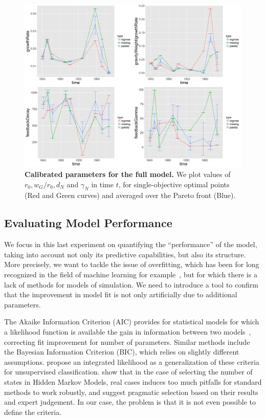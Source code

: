 \documentclass[Royal,sageh,times]{sagej}
\begin{document}
\begin{figure}
\centering
\includegraphics[width=\textwidth]{figures/Fig6}
\caption{\textbf{Calibrated parameters for the full model.} We plot values of $r_0, w_G/r_0, d_N$ and $\gamma_N$ in time $t$, for single-objective optimal points (Red and Green curves) and averaged over the Pareto front (Blue).}
\label{fig:feedback}
\end{figure}







\subsection*{Evaluating Model Performance}

We focus in this last experiment on quantifying the ``performance'' of the model, taking into account not only its predictive capabilities, but also its structure. More precisely, we want to tackle the issue of overfitting, which has been for long recognized in the field of machine learning for example~\citep{dietterich1995overfitting}, but for which there is a lack of methods for models of simulation. We need to introduce a tool to confirm that the improvement in model fit is not only artificially due to additional parameters.

The Akaike Information Criterion (AIC) provides for statistical models for which a likelihood function is available the gain in information between two models~\citep{akaike1998information}, correcting fit improvement for number of parameters. Similar methods include the Bayesian Information Criterion (BIC), which relies on slightly different assumptions. \cite{biernacki2000assessing} propose an integrated likelihood as a generalization of these criteria for unsupervised classification. \cite{2017arXiv170108673P} show that in the case of selecting the number of states in Hidden Markov Models, real cases induces too much pitfalls for standard methods to work robustly, and suggest pragmatic selection based on their results and expert judgement. In our case, the problem is that it is not even possible to define the criteria.
\end{document}
